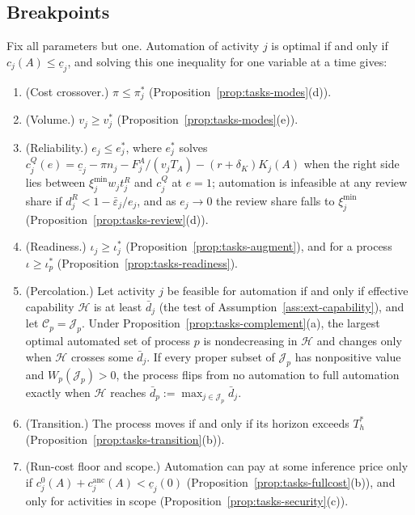 \subsection{Breakpoints}\label{sec:tasks-breakpoints}

\begin{proposition}[Breakpoints]\label{prop:tasks-breakpoints}
Fix all parameters but one. Automation of activity $j$ is optimal if and only if $c_j(A)\le\underline c_j$, and solving this one inequality for one variable at a time gives:
\begin{enumerate}
\item[(1)] (Cost crossover.) $\pi\le\pi^*_j$ (Proposition~\ref{prop:tasks-modes}(d)).
\item[(2)] (Volume.) $v_j\ge v^*_j$ (Proposition~\ref{prop:tasks-modes}(e)).
\item[(3)] (Reliability.) $e_j\le e^*_j$, where $e^*_j$ solves $c^Q_j(e)=\underline c_j-\pi n_j-F^A_j/(v_jT_A)-(r+\delta_K)K_j(A)$ when the right side lies between $\xi^{\min}_jw_jt^R_j$ and $c^Q_j$ at $e=1$; automation is infeasible at any review share if $d^R_j<1-\bar\varepsilon_j/e_j$, and as $e_j\to 0$ the review share falls to $\xi^{\min}_j$ (Proposition~\ref{prop:tasks-review}(d)).
\item[(4)] (Readiness.) $\iota_j\ge\iota^*_j$ (Proposition~\ref{prop:tasks-augment}), and for a process $\iota\ge\iota^*_p$ (Proposition~\ref{prop:tasks-readiness}).
\item[(5)] (Percolation.) Let activity $j$ be feasible for automation if and only if effective capability $\mathcal H$ is at least $\bar d_j$ (the test of Assumption~\ref{ass:ext-capability}), and let $\mathcal C_p=\mathcal J_p$. Under Proposition~\ref{prop:tasks-complement}(a), the largest optimal automated set of process $p$ is nondecreasing in $\mathcal H$ and changes only when $\mathcal H$ crosses some $\bar d_j$. If every proper subset of $\mathcal J_p$ has nonpositive value and $W_p(\mathcal J_p)>0$, the process flips from no automation to full automation exactly when $\mathcal H$ reaches $\bar d_p:=\max_{j\in\mathcal J_p}\bar d_j$.
\item[(6)] (Transition.) The process moves if and only if its horizon exceeds $T_h^*$ (Proposition~\ref{prop:tasks-transition}(b)).
\item[(7)] (Run-cost floor and scope.) Automation can pay at some inference price only if $c^0_j(A)+c^{\mathrm{anc}}_j(A)<\underline c_j(0)$ (Proposition~\ref{prop:tasks-fullcost}(b)), and only for activities in scope (Proposition~\ref{prop:tasks-security}(c)).

\end{enumerate}
\end{proposition}
